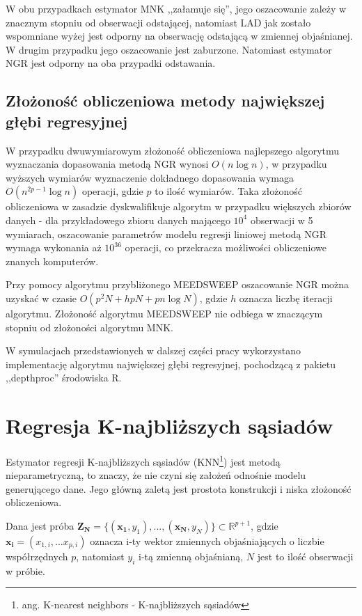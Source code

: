 \documentclass[man,mfu]{mgrwms}
\begin{document}
W obu przypadkach estymator MNK ,,załamuje się'', jego oszacowanie zależy w znacznym stopniu od obserwacji odstającej, natomiast LAD jak zostało wspomniane wyżej jest odporny na obserwację odstającą w zmiennej objaśnianej. W drugim przypadku jego oszacowanie jest zaburzone. Natomiast estymator NGR jest odporny na oba przypadki odstawania.

\subsection{Złożoność obliczeniowa metody największej głębi regresyjnej}

W przypadku dwuwymiarowym złożoność obliczeniowa najlepszego algorytmu wyznaczania dopasowania metodą NGR wynosi $O(n\log n)$\cite{DRM}, w przypadku wyższych wymiarów wyznaczenie dokładnego dopasowania wymaga $O(n^{2p-1}\log n)$ operacji, gdzie $p$ to ilość wymiarów. Taka złożoność obliczeniowa w zasadzie dyskwalifikuje algorytm w przypadku większych zbiorów danych - dla przykładowego zbioru danych mającego $10^4$ obserwacji w 5 wymiarach, oszacowanie parametrów modelu regresji liniowej metodą NGR wymaga wykonania aż $10^{36}$ operacji, co przekracza możliwości obliczeniowe znanych komputerów.

Przy pomocy algorytmu przybliżonego MEEDSWEEP\cite{DRM} oszacowanie NGR można uzyskać w czasie $O(p^2N+hpN+pn \log N)$, gdzie $h$ oznacza liczbę iteracji algorytmu. Złożoność algorytmu MEEDSWEEP nie odbiega w znaczącym stopniu od złożoności algorytmu MNK.

W symulacjach przedstawionych w dalszej części pracy wykorzystano implementację algorytmu największej głębi regresyjnej, pochodzącą z pakietu ,,depthproc'' środowiska R\cite{depthproc}.

\section{Regresja K-najbliższych sąsiadów}

Estymator regresji K-najbliższych sąsiadów (KNN\footnote{ang. K-nearest neighbors - K-najbliższych sąsiadów}) \cite{Hardle1990} jest metodą nieparametryczną, to znaczy, że nie czyni się założeń odnośnie modelu generującego dane. Jego główną zaletą jest prostota konstrukcji i niska złożoność obliczeniowa.

Dana jest próba $\mathbf{Z_N} = \{(\mathbf{x_1},y_1),...,(\mathbf{x_N},y_N)\} \subset \mathbb{R}^{p+1}$, gdzie $\mathbf{x_i} = (x_{1,i},...x_{p,i})$ oznacza i-ty wektor zmiennych objaśniających o liczbie współrzędnych $p$, natomiast $y_i$ i-tą zmienną objaśnianą, $N$ jest to ilość obserwacji w próbie.
\end{document}
